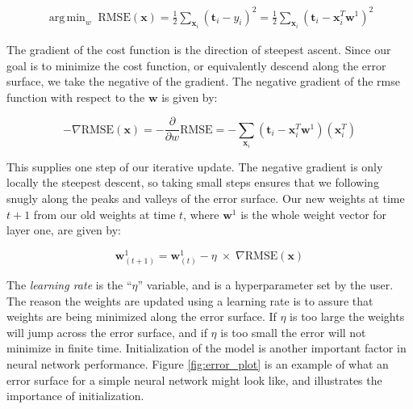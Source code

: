 \message{ !name(main.tex)}\documentclass[11pt]{article}
\DeclareMathOperator*{\argmin}{arg\,min}
\begin{document}
\[
  \begin{aligned}
    \argmin_{w} \;\mathrm{RMSE}(\mathbf{x}) = \frac{1}{2}\sum_{\mathbf{x}_{i}} \left(\mathbf{t}_{i} - y_{i}\right)^{2} = \frac{1}{2}\sum_{\mathbf{x}_{i}} \left(\mathbf{t}_{i} - \mathbf{x}_{i}^{T}\mathbf{w}^{1}\right)^{2}
  \end{aligned}
\]

The gradient of the cost function is the direction of steepest ascent. Since our goal is to minimize the cost function, or equivalently descend along the error surface, we take the negative of the gradient. The negative gradient of the rmse function with respect to the $\mathbf{w}$ is given by:

\begin{equation}
  - \nabla\mathrm{RMSE}(\mathbf{x}) = - \frac{\partial }{\partial w}\mathrm{RMSE} = - \sum_{\mathbf{x}_{i}} \left(\mathbf{t}_{i} -  \mathbf{x}_{i}^{T}\mathbf{w}^{1}\right)\left(\mathbf{x}_{i}^{T}\right)
\end{equation}

This supplies one step of our iterative update. The negative gradient is only locally the steepest descent, so taking small steps ensures that we following snugly along the peaks and valleys of the error surface. Our new weights at time $t+1$ from our old weights at time $t$, where $\mathbf{w}^{1}$ is the whole weight vector for layer one, are given by:

\begin{equation}\label{eq:weight_update}
  \mathbf{w}_{(t+1)}^{1} = \mathbf{w}_{(t)}^{1} - \eta\;\times\;\nabla\mathrm{RMSE}(\mathbf{x})
\end{equation}

The \emph{learning rate} is the ``$\eta$'' variable, and is a hyperparameter set by the user. The reason the weights are updated using a learning rate is to assure that weights are being minimized along the error surface. If $\eta$ is too large the weights will jump across the error surface, and if $\eta$ is too small the error will not minimize in finite time. Initialization of the model is another important factor in neural network performance. Figure \ref{fig:error_plot} is an example of what an error surface for a simple neural network might look like, and illustrates the importance of initialization.  
\end{document}
